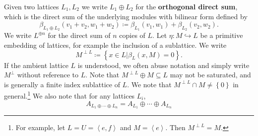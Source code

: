 \documentclass{amsart}
\begin{document}
\begin{remark}

Given two lattices \(L_1, L_2\) we write \(L_1\oplus L_2\) for the \textbf{orthogonal direct sum}, which is the direct sum of the underlying modules with bilinear form defined by \[\beta_{L_1\oplus L_2}(v_1 + v_2, w_1 + w_2)\coloneqq\beta_{L_1}(v_1, w_1) + \beta_{L_2}(v_2, w_2) 
.\] We write \(L^{\oplus n}\) for the direct sum of \(n\) copies of \(L\). Let \(\eta: M \hookrightarrow L\) be a primitive embedding of lattices, for example the inclusion of a sublattice. We write \[M^{\perp L} \coloneqq\left\{{x\in L \mathrel{\Big|}\beta_L(x, M) = 0}\right\}
.\] If the ambient lattice \(L\) is understood, we often abuse notation and simply write \(M^{\perp}\) without reference to \(L\). Note that \(M^{\perp L}\oplus M \subseteq L\) may not be saturated, and is generally a finite index sublattice of \(L\). We note that \(M^{\perp L}\cap M \neq \left\{{0}\right\}\) in general.\footnote{For example, let \(L = U = \left\langle{e,f}\right\rangle\) and \(M = \left\langle{e}\right\rangle\). Then \(M^{\perp L} = M\).} We also note that for any lattices \(L_i\), \[
A_{L_1 \oplus \cdots \oplus L_n} = A_{L_1} \oplus \cdots \oplus A_{L_n}
\]

\end{remark}
\end{document}
